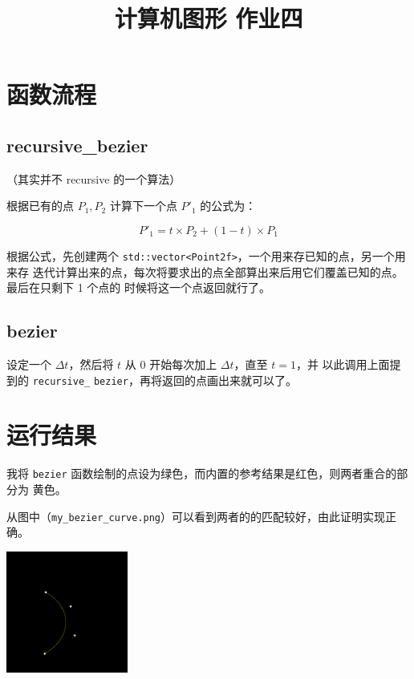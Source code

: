 \documentclass{ctexart}
\title{计算机图形 作业四}
\author{\theauthor}
\begin{document}
    \maketitle

    \section{函数流程}

    \subsection{recursive\_bezier}

    （其实并不 recursive 的一个算法）

    根据已有的点 $P_1, P_2$ 计算下一个点 $P'_1$ 的公式为：

    \[
        P'_1 = t \times P_2 + (1-t) \times P_1
    \]

    根据公式，先创建两个 \verb|std::vector<Point2f>|，一个用来存已知的点，另一个用来存
    迭代计算出来的点，每次将要求出的点全部算出来后用它们覆盖已知的点。最后在只剩下 1 个点的
    时候将这一个点返回就行了。

    \subsection{bezier}

    设定一个 $\Delta t$，然后将 $t$ 从 0 开始每次加上 $\Delta t$，直至 $t = 1$，并
    以此调用上面提到的 \texttt{recursive\_} \texttt{bezier}，再将返回的点画出来就可以了。

    \section{运行结果}

    我将 \verb|bezier| 函数绘制的点设为绿色，而内置的参考结果是红色，则两者重合的部分为
    黄色。

    从图中（\texttt{my\_bezier\_curve.png}）可以看到两者的的匹配较好，由此证明实现正确。

    \begin{center}
        \includegraphics[width=0.3\textwidth]{pics/result.png}
    \end{center}
\end{document}
